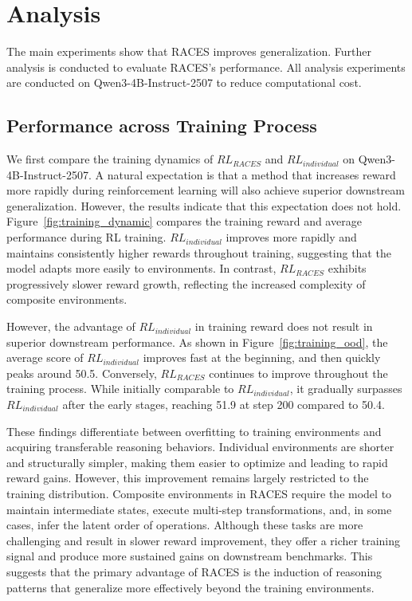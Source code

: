 \section{Analysis}
\label{sec:analysis}

The main experiments show that RACES improves generalization.
Further analysis is conducted to evaluate RACES's performance.
All analysis experiments are conducted on Qwen3-4B-Instruct-2507 to reduce computational cost.

\subsection{Performance across Training Process}
\label{sec:training_dynamic}

We first compare the training dynamics of $RL_{RACES}$ and $RL_{individual}$ on Qwen3-4B-Instruct-2507.
A natural expectation is that a method that increases reward more rapidly during reinforcement learning will also achieve superior downstream generalization.
However, the results indicate that this expectation does not hold. Figure~\ref{fig:training_dynamic} compares the training reward and average performance during RL training.
$RL_{individual}$ improves more rapidly and maintains consistently higher rewards throughout training, suggesting that the model adapts more easily to environments.
In contrast, $RL_{RACES}$ exhibits progressively slower reward growth, reflecting the increased complexity of composite environments.

However, the advantage of $RL_{individual}$ in training reward does not result in superior downstream performance.
As shown in Figure~\ref{fig:training_ood}, the average score of $RL_{individual}$ improves fast at the beginning, and then quickly peaks around 50.5.
Conversely, $RL_{RACES}$ continues to improve throughout the training process. While initially comparable to $RL_{individual}$, it gradually surpasses $RL_{individual}$ after the early stages, reaching 51.9 at step 200 compared to 50.4.

These findings differentiate between overfitting to training environments and acquiring transferable reasoning behaviors.
Individual environments are shorter and structurally simpler, making them easier to optimize and leading to rapid reward gains.
However, this improvement remains largely restricted to the training distribution.
Composite environments in RACES require the model to maintain intermediate states, execute multi-step transformations, and, in some cases, infer the latent order of operations.
Although these tasks are more challenging and result in slower reward improvement, they offer a richer training signal and produce more sustained gains on downstream benchmarks.
This suggests that the primary advantage of RACES is the induction of reasoning patterns that generalize more effectively beyond the training environments.

